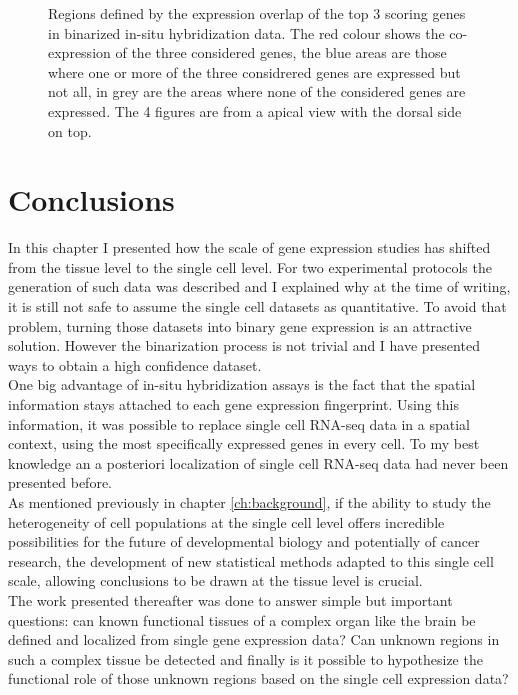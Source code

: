 \begin{figure}[h]
        \caption{Regions defined by the expression overlap of the top 3 scoring genes in \cite{Tomer10} binarized in-situ hybridization data. The red colour shows the co-expression of the three considered genes, the blue areas are those where one or more of the three considrered genes are expressed but not all, in grey are the areas where none of the considered genes are expressed. The 4 figures are from a apical view with the dorsal side on top.}\label{fig:cell_localization}
\end{figure}


\section{Conclusions}
In this chapter I presented how the scale of gene expression studies has shifted from the tissue level to the single cell level. For two experimental protocols the generation of such data was described and I explained why at the time of writing, it is still not safe to assume the single cell datasets as quantitative. To avoid that problem, turning those datasets into binary gene expression is an attractive solution. However the binarization process is not trivial and I have presented ways to obtain a high confidence dataset.\\

One big advantage of in-situ hybridization assays is the fact that the spatial information stays attached to each gene expression fingerprint. Using this information, it was possible to replace single cell RNA-seq data in a spatial context, using the most specifically expressed genes in every cell. To my best knowledge an a posteriori localization of single cell RNA-seq data had never been presented before.\\

As mentioned previously in chapter \ref{ch:background}, if the ability to study the heterogeneity of cell populations at the single cell level offers incredible possibilities for the future of developmental biology and potentially of cancer research, the development of new statistical methods adapted to this single cell scale, allowing conclusions to be drawn at the tissue level is crucial.\\

The work presented thereafter was done to answer simple but important questions: can known functional tissues of a complex organ like the brain be defined and localized from single gene expression data? Can unknown regions in such a complex tissue be detected and finally is it possible to hypothesize the functional role of those unknown regions based on the single cell expression data?


	
	



